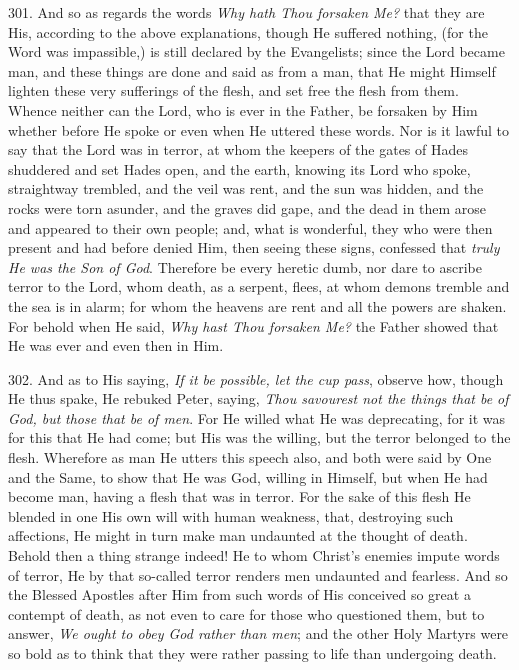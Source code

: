 301.
And so as regards the words \emph{Why hath Thou forsaken Me?} that
they are His, according to the above explanations, though He suffered
nothing, (for the Word was impassible,) is still declared by the
Evangelists; since the Lord became man, and these things are done and
said as from a man, that He might Himself lighten these very
sufferings of the flesh, and set free the flesh from them. Whence
neither can the Lord, who is ever in the Father, be forsaken by Him
whether before He spoke or even when He uttered these words. Nor is it
lawful to say that the Lord was in terror, at whom the keepers of the
gates of Hades shuddered and set Hades open, and the earth, knowing
its Lord who spoke, straightway trembled, and the veil was rent, and
the sun was hidden, and the rocks were torn asunder, and the graves
did gape, and the dead in them arose and appeared to their own people;
and, what is wonderful, they who were then present and had before
denied Him, then seeing these signs, confessed that \emph{truly He was
the Son of God}. Therefore be every heretic dumb, nor dare to
ascribe terror to the Lord, whom death, as a serpent, flees, at whom
demons tremble and the sea is in alarm; for whom the heavens are rent
and all the powers are shaken. For behold when He said, \emph{Why hast
Thou forsaken Me?} the Father showed that He was ever and even then
in Him.

302.
And as to His saying, \emph{If it be possible, let the cup pass},
observe how, though He thus spake, He rebuked Peter, saying, \emph{Thou
savourest not the things that be of God, but} \emph{those that
be of men}. For He willed what He was deprecating, for it was for
this that He had come; but His was the willing, but the terror
belonged to the flesh. Wherefore as man He utters this speech also,
and both were said by One and the Same, to show that He was God,
willing in Himself, but when He had become man, having a flesh that
was in terror. For the sake of this flesh He blended in one His own
will with human weakness, that, destroying such affections, He might
in turn make man undaunted at the thought of death. Behold then a
thing strange indeed! He to whom Christ's enemies impute words of
terror, He by that so-called terror renders men undaunted and
fearless. And so the Blessed Apostles after Him from such words of His
conceived so great a contempt of death, as not even to care for those
who questioned them, but to answer, \emph{We ought to obey God rather
than men}; and the other Holy Martyrs were so bold as to think that
they were rather passing to life than undergoing death.

